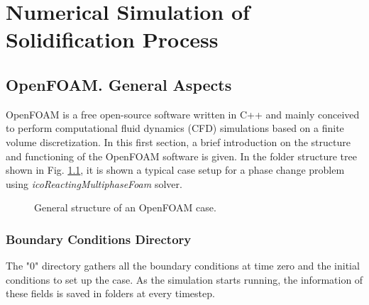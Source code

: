 
\chapter{Numerical Simulation of Solidification Process} %

\label{Chapter3} %
\section{OpenFOAM. General Aspects}
OpenFOAM is a free open-source software written in C++ and mainly conceived to perform computational fluid dynamics (CFD) simulations based on a finite volume discretization. 
In this first section, a brief introduction on the structure and functioning of the OpenFOAM software is given.
In the folder structure tree shown in Fig. \ref{fig:structureOF}, it is shown a typical case setup for a phase change problem using \textit{icoReactingMultiphaseFoam} solver.
\clearpage
\begin{figure}[h!]
	\centering
	\label{fig:structureOF}
	\caption{General structure of an OpenFOAM case.}
\end{figure}

\subsection{Boundary Conditions Directory}
The "0" directory gathers all the boundary conditions at time zero and the initial conditions to set up the case. As the simulation starts running, the information of these fields is saved in folders at every timestep.
